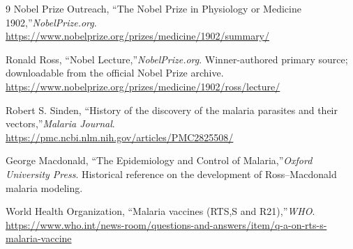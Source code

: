 \begin{thebibliography}{9}
Nobel Prize Outreach, ``The Nobel Prize in Physiology or Medicine 1902,''\emph{NobelPrize.org}.\\
\url{https://www.nobelprize.org/prizes/medicine/1902/summary/}

Ronald Ross, ``Nobel Lecture,''\emph{NobelPrize.org}. Winner-authored primary source; downloadable from the official Nobel Prize archive.\\
\url{https://www.nobelprize.org/prizes/medicine/1902/ross/lecture/}

Robert S. Sinden, ``History of the discovery of the malaria parasites and their vectors,''\emph{Malaria Journal}.\\
\url{https://pmc.ncbi.nlm.nih.gov/articles/PMC2825508/}

George Macdonald, ``The Epidemiology and Control of Malaria,''\emph{Oxford University Press}. Historical reference on the development of Ross--Macdonald malaria modeling.

World Health Organization, ``Malaria vaccines (RTS,S and R21),''\emph{WHO}.\\
\url{https://www.who.int/news-room/questions-and-answers/item/q-a-on-rts-s-malaria-vaccine}
\end{thebibliography}
